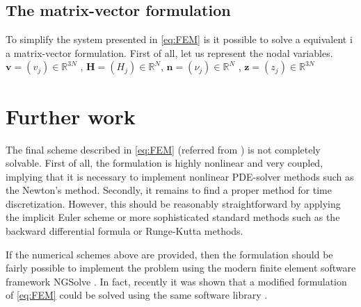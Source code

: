 


\subsection{The matrix-vector formulation}%
\label{sub:the_matrix_formulation}

To simplify the system presented in \eqref{eq:FEM} is it possible to solve a equivalent i a matrix-vector formulation. First of all, let us represent the nodal variables. $\mathbf{v} = \left( v_{j} \right) \in \mathbb{R} ^{3N}$ , $\mathbf{H}  =
\left( H_{j} \right)  \in  \mathbb{R} ^{N}  $, $\mathbf{n} = \left( \nu _{j} \right) \in  \mathbb{R} ^{N}$ , $\mathbf{z} = \left( z_{j} \right) \in \mathbb{R} ^{3N}$     




\section{Further work}
The final scheme described in \eqref{eq:FEM} (referred from \cite{kovacs2021convergent}) is not completely solvable. First of all, the formulation is highly nonlinear and very coupled, implying that it is necessary to implement nonlinear PDE-solver methods such as the Newton's method. Secondly, it remains to find a proper method for time discretization. However, this should be reasonably straightforward by applying the implicit Euler scheme or more sophisticated standard methods such as the backward differential formula or Runge-Kutta methods.

If the numerical schemes above are provided, then the formulation should be fairly possible to implement the problem using the modern finite element software framework NGSolve \cite{schoberl2017netgen}. In fact, recently it was shown that a modified formulation of \eqref{eq:FEM} could be solved using the same software library \cite{hu2022evolving}.
